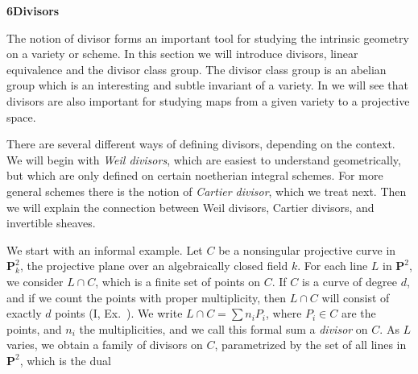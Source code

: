 {\medskip
\noindent\hypertarget{sec-II-6}{}{\large\bfseries 6\quad Divisors}\par
\smallskip
The notion of divisor forms an important tool for studying the intrinsic geometry on a variety or scheme. In this section we will introduce divisors, linear equivalence and the divisor class group. The divisor class group is an abelian group which is an interesting and subtle invariant of a variety. In  we will see that divisors are also important for studying maps from a given variety to a projective space.

There are several different ways of defining divisors, depending on the context. We will begin with \emph{Weil divisors}, which are easiest to understand geometrically, but which are only defined on certain noetherian integral schemes. For more general schemes there is the notion of \emph{Cartier divisor}, which we treat next. Then we will explain the connection between Weil divisors, Cartier divisors, and invertible sheaves.

\smallskip
We start with an informal example. Let $C$ be a nonsingular projective curve in $\mathbf P_k^2$, the projective plane over an algebraically closed field $k$. For each line $L$ in $\mathbf P^2$, we consider $L\cap C$, which is a finite set of points on $C$. If $C$ is a curve of degree $d$, and if we count the points with proper multiplicity, then $L\cap C$ will consist of exactly $d$ points (I, Ex.~). We write $L\cap C=\sum n_iP_i$, where $P_i\in C$ are the points, and $n_i$ the multiplicities, and we call this formal sum a \emph{divisor} on $C$. As $L$ varies, we obtain a family of divisors on $C$, parametrized by the set of all lines in $\mathbf P^2$, which is the dual}

